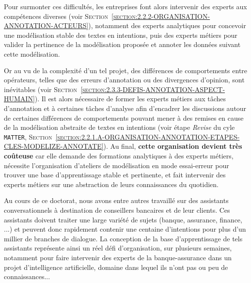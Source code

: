 	Pour surmonter ces difficultés, les entreprises font alors intervenir des experts aux compétences diverses (voir \textsc{Section~\ref{section:2.2.2-ORGANISATION-ANNOTATION-ACTEURS}}), notamment des experts analytiques pour concevoir une modélisation stable des textes en intentions, puis des experts métiers pour valider la pertinence de la modélisation proposée et annoter les données suivant cette modélisation.
	
	
	Or au vu de la complexité d'un tel projet, des différences de comportements entre opérateurs, telles que des erreurs d'annotation ou des divergences d'opinion, sont inévitables (voir \textsc{Section~\ref{section:2.3.3-DEFIS-ANNOTATION-ASPECT-HUMAIN}}).
	Il est alors nécessaire de former les experts métiers aux tâches d'annotation et à certaines tâches d'analyse afin d'encadrer les discussions autour de certaines différences de comportements pouvant mener à des remises en cause de la modélisation abstraite de textes en intentions (voir étape \textit{Revise} du cyle \texttt{MATTER}, \textsc{Section~\ref{section:2.2.1.A-ORGANISATION-ANNOTATION-ETAPES-CLES-MODELIZE-ANNOTATE}}).
	Au final, \textbf{cette organisation devient très coûteuse} car elle demande des formations analytiques à des experts métiers, nécessite l'organisation d'ateliers de modélisation en mode essai-erreur pour trouver une base d'apprentissage stable et pertinente, et fait intervenir des experts métiers sur une abstraction de leurs connaissances du quotidien.
	
	\begin{leftBarExamples}
		Au cours de ce doctorat, nous avons entre autres travaillé sur des assistants conversationnels à destination de conseillers bancaires et de leur clients.
		Ces assistants doivent traiter une large variété de sujets (banque, assurance, finance, ...) et peuvent donc rapidement contenir une centaine d'intentions pour plus d'un millier de branches de dialogue.
		La conception de la base d'apprentissage de tels assistants représente ainsi un réel défi d'organisation, sur plusieurs semaines, notamment pour faire intervenir des experts de la banque-assurance dans un projet d'intelligence artificielle, domaine dans lequel ils n'ont pas ou peu de connaissances...
	\end{leftBarExamples}
	
